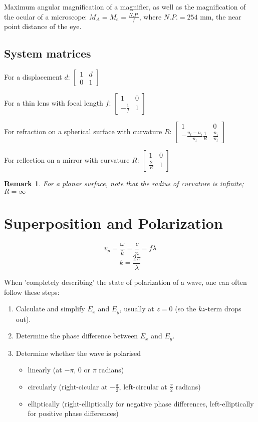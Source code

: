 \documentclass{article}
\newtheorem*{remark}{Remark}
\begin{document}
\noindent{}Maximum angular magnification of a magnifier, as well as the magnification of the ocular of a microscope:
$M_A=M_e=\frac{N.P.}{f}$, where $N.P.=254$ \si{\milli\metre}, the near point distance of the eye.

\subsection{System matrices}

\noindent{}For a displacement $d$:
$
\begin{bmatrix}
1 & d\\
0 & 1
\end{bmatrix}
$

\noindent{}For a thin lens with focal length $f$:
$
\begin{bmatrix}
1 & 0\\
-\frac{1}{f} & 1
\end{bmatrix}
$

\noindent{}For refraction on a spherical surface with curvature $R$:
$
\begin{bmatrix}
1 & 0\\
-\frac{n_t-n_i}{n_t}\frac{1}{R} & \frac{n_i}{n_t}
\end{bmatrix}
$

\noindent{}For reflection on a mirror with curvature $R$:
$
\begin{bmatrix}
1 & 0\\
\frac{2}{R} & 1
\end{bmatrix}
$

\begin{remark}
For a planar surface, note that the radius of curvature is infinite; $R=\infty$
\end{remark}

\section{Superposition and Polarization}
$$v_p=\frac{\omega}{k}=\frac{c}{n}=f\lambda$$
$$k=\frac{2\pi}{\lambda}$$

\noindent{}When 'completely describing' the state of polarization of a wave, one can often follow these steps:
\begin{enumerate}
\item Calculate and simplify $E_x$ and $E_y$, usually at $z=0$ (so the $kz$-term drops out).
\item Determine the phase difference between $E_x$ and $E_y$.
\item Determine whether the wave is polarised
\begin{itemize}
\item linearly (at $-\pi$, $0$ or $\pi$ radians)
\item circularly (right-cicular at $-\frac{\pi}{2}$, left-circular at $\frac{\pi}{2}$ radians)
\item elliptically (right-elliptically for negative phase differences, left-elliptically for positive phase differences)
\end{itemize}
\end{enumerate}
\end{document}
